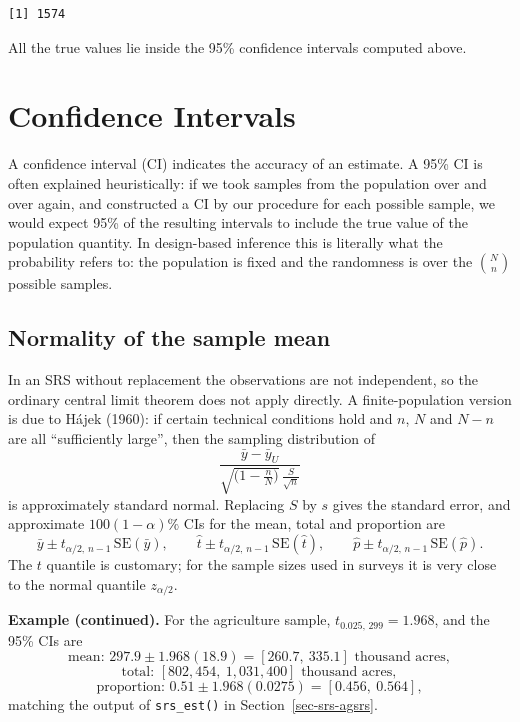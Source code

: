 \documentclass[
  letterpaper,
  DIV=11,
  numbers=noendperiod]{scrreprt}
\renewcommand{\[}{\begin{equation}}
\renewcommand{\]}{\end{equation}}
\begin{document}
\begin{verbatim}
[1] 1574
\end{verbatim}

All the true values lie inside the 95\% confidence intervals computed
above.

\section{Confidence Intervals}\label{sec-srs-ci}

A confidence interval (CI) indicates the accuracy of an estimate. A 95\%
CI is often explained heuristically: if we took samples from the
population over and over again, and constructed a CI by our procedure
for each possible sample, we would expect 95\% of the resulting
intervals to include the true value of the population quantity. In
design-based inference this is literally what the probability refers to:
the population is fixed and the randomness is over the \(\binom{N}{n}\)
possible samples.

\subsection{Normality of the sample
mean}\label{normality-of-the-sample-mean}

In an SRS without replacement the observations are not independent, so
the ordinary central limit theorem does not apply directly. A
finite-population version is due to Hájek (1960): if certain technical
conditions hold and \(n\), \(N\) and \(N-n\) are all ``sufficiently
large'', then the sampling distribution of \[
\frac{\bar y - \bar y_{U}}{\sqrt{\big(1-\tfrac nN\big)}\, \tfrac{S}{\sqrt n}}
\] is approximately standard normal. Replacing \(S\) by \(s\) gives the
standard error, and approximate \(100(1-\alpha)\%\) CIs for the mean,
total and proportion are \[
\bar y \pm t_{\alpha/2,\, n-1} \, \mathrm{SE}(\bar y), \qquad
\hat t \pm t_{\alpha/2,\, n-1} \, \mathrm{SE}(\hat t), \qquad
\hat p \pm t_{\alpha/2,\, n-1} \, \mathrm{SE}(\hat p).
\] The \(t\) quantile is customary; for the sample sizes used in surveys
it is very close to the normal quantile \(z_{\alpha/2}\).

\textbf{Example (continued).} For the agriculture sample,
\(t_{0.025,\,299} = 1.968\), and the 95\% CIs are \[
\text{mean: } 297.9 \pm 1.968(18.9) = [260.7,\ 335.1] \text{ thousand acres},
\] \[
\text{total: } [802,454,\ 1,031,400] \text{ thousand acres},
\] \[
\text{proportion: } 0.51 \pm 1.968(0.0275) = [0.456,\ 0.564],
\] matching the output of \texttt{srs\_est()} in
Section~\ref{sec-srs-agsrs}.
\end{document}
